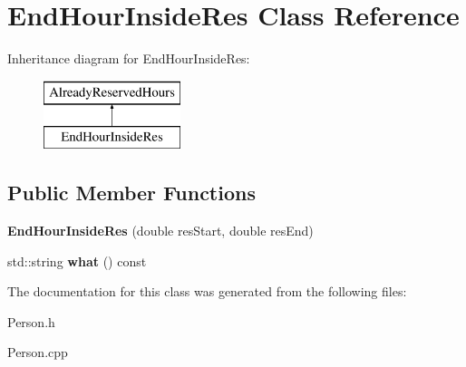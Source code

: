 \hypertarget{class_end_hour_inside_res}{}\section{End\+Hour\+Inside\+Res Class Reference}
\label{class_end_hour_inside_res}
Inheritance diagram for End\+Hour\+Inside\+Res\+:\begin{figure}[H]
\begin{center}
\leavevmode
\includegraphics[height=2.000000cm]{class_end_hour_inside_res}
\end{center}
\end{figure}
\subsection*{Public Member Functions}
\begin{DoxyCompactItemize}
\item 
\mbox{\label{class_end_hour_inside_res_af2162a2e870bf25d64f773089def5ec2}} 
{\bfseries End\+Hour\+Inside\+Res} (double res\+Start, double res\+End)
\item 
\mbox{\label{class_end_hour_inside_res_afee9514b15c167847bc55ebe833076ff}} 
std\+::string {\bfseries what} () const
\end{DoxyCompactItemize}


The documentation for this class was generated from the following files\+:\begin{DoxyCompactItemize}
\item 
Person.\+h\item 
Person.\+cpp\end{DoxyCompactItemize}
